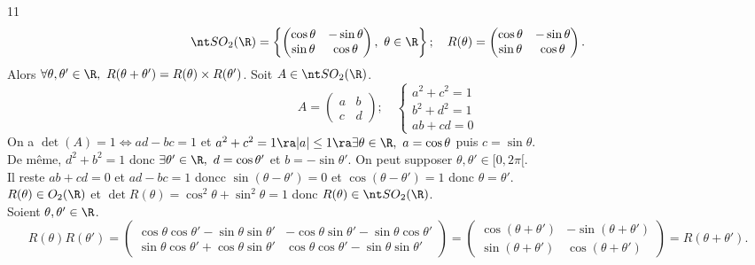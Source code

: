 \documentclass[11pt]{article}
\begin{document}
\begin{prop}{}{11}
    \begin{equation*}
        \SO_2(\R) = \left\{ \begin{pmatrix}\cos\theta&-\sin\theta\\\sin\theta&\cos\theta \end{pmatrix}, ~ \theta\in\R \right\}; \quad R(\theta) = \begin{pmatrix}\cos\theta&-\sin\theta\\\sin\theta&\cos\theta\end{pmatrix}.
    \end{equation*}
    Alors $\forall \theta,\theta'\in\R, ~ R(\theta+\theta')=R(\theta)\times R(\theta')$.
    \tcblower
    \boxed{\subset} Soit $A\in\SO_2(\R)$.
    \begin{equation*}
        A=\begin{pmatrix}a&b\\c&d\end{pmatrix}; \quad \begin{cases}a^2+c^2 = 1\\b^2+d^2=1\\ab+cd=0\end{cases}
    \end{equation*}
    On a $\det(A) = 1 \iff ad-bc = 1$ et $a^2+c^2=1 \ra |a|\leq 1 \ra \exists\theta\in\R, ~ a=\cos\theta$ puis $c=\sin\theta$.\\
    De même, $d^2+b^2=1$ donc $\exists \theta'\in\R, ~ d=\cos\theta'$ et $b=-\sin\theta'$. On peut supposer $\theta,\theta'\in[0,2\pi[$.\\
    Il reste $ab+cd = 0$ et $ad-bc=1$ doncc $\sin(\theta-\theta')=0$ et $\cos(\theta-\theta')=1$ donc $\theta=\theta'$.\\
    \boxed{\supset} $R(\theta)\in O_2(\R)$ et $\det R(\theta)=\cos^2\theta+\sin^2\theta=1$ donc $R(\theta)\in \SO_2(\R)$.\\
    Soient $\theta,\theta'\in\R$.
    \begin{equation*}
        R(\theta)R(\theta')=\begin{pmatrix}\cos\theta\cos\theta'-\sin\theta\sin\theta' & -\cos\theta\sin\theta'-\sin\theta\cos\theta'\\\sin\theta\cos\theta'+\cos\theta\sin\theta'&\cos\theta\cos\theta'-\sin\theta\sin\theta'\end{pmatrix} = \begin{pmatrix}\cos(\theta+\theta')&-\sin(\theta+\theta')\\\sin(\theta+\theta')&\cos(\theta+\theta')\end{pmatrix}=R(\theta+\theta').
    \end{equation*}
\end{prop}
\end{document}
